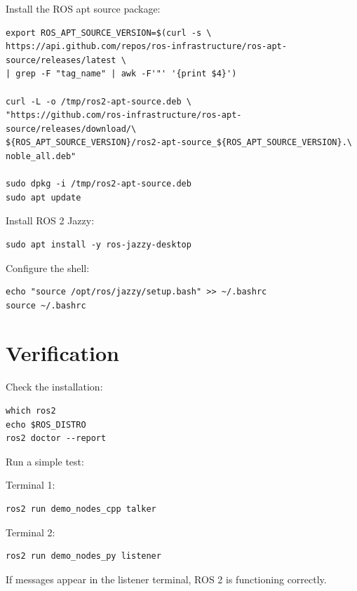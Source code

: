 \documentclass[11pt]{article}
\begin{document}
Install the ROS apt source package:

\begin{verbatim}
export ROS_APT_SOURCE_VERSION=$(curl -s \
https://api.github.com/repos/ros-infrastructure/ros-apt-source/releases/latest \
| grep -F "tag_name" | awk -F'"' '{print $4}')

curl -L -o /tmp/ros2-apt-source.deb \
"https://github.com/ros-infrastructure/ros-apt-source/releases/download/\
${ROS_APT_SOURCE_VERSION}/ros2-apt-source_${ROS_APT_SOURCE_VERSION}.\
noble_all.deb"

sudo dpkg -i /tmp/ros2-apt-source.deb
sudo apt update
\end{verbatim}

Install ROS 2 Jazzy:

\begin{verbatim}
sudo apt install -y ros-jazzy-desktop
\end{verbatim}

Configure the shell:

\begin{verbatim}
echo "source /opt/ros/jazzy/setup.bash" >> ~/.bashrc
source ~/.bashrc
\end{verbatim}

\section{Verification}

Check the installation:

\begin{verbatim}
which ros2
echo $ROS_DISTRO
ros2 doctor --report
\end{verbatim}

Run a simple test:

Terminal 1:

\begin{verbatim}
ros2 run demo_nodes_cpp talker
\end{verbatim}

Terminal 2:

\begin{verbatim}
ros2 run demo_nodes_py listener
\end{verbatim}

If messages appear in the listener terminal, ROS 2 is functioning correctly.
\end{document}
